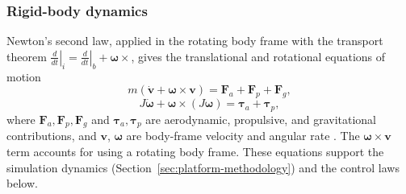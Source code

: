 \documentclass{article}
\begin{document}
\subsubsection{Rigid-body dynamics}
\label{sec:rigidbody-dynamics}
Newton's second law, applied in the rotating body frame with the transport theorem $\left.\tfrac{d}{dt}\right|_i=\left.\tfrac{d}{dt}\right|_b+\boldsymbol{\omega}\times$, gives the translational and rotational equations of motion
\begin{equation}
    m\left(\dot{\mathbf{v}}+\boldsymbol{\omega}\times\mathbf{v}\right)=\mathbf{F}_{a}+\mathbf{F}_{p}+\mathbf{F}_{g},
    \label{eq:translation}
\end{equation}
\begin{equation}
    J\dot{\boldsymbol{\omega}}+\boldsymbol{\omega}\times(J\boldsymbol{\omega})=\boldsymbol{\tau}_{a}+\boldsymbol{\tau}_{p},
    \label{eq:rotation}
\end{equation}
where $\mathbf{F}_{a},\mathbf{F}_{p},\mathbf{F}_{g}$ and $\boldsymbol{\tau}_{a},\boldsymbol{\tau}_{p}$ are aerodynamic, propulsive, and gravitational contributions, and $\mathbf{v}$, $\boldsymbol{\omega}$ are body-frame velocity and angular rate \citep{beardmclain2012}. The $\boldsymbol{\omega}\times\mathbf{v}$ term accounts for using a rotating body frame. These equations support the simulation dynamics (Section~\ref{sec:platform-methodology}) and the control laws below.

\end{document}
